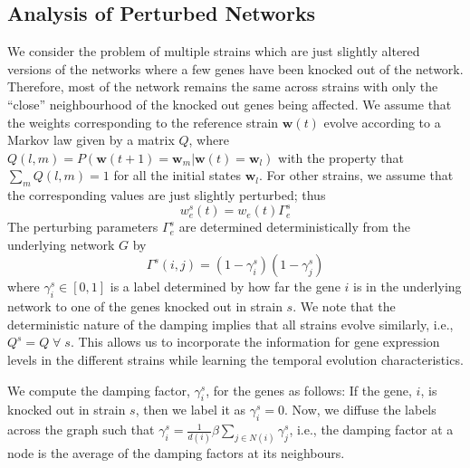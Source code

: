 \documentclass{bioinfo}
\begin{document}
\begin{methods}
\subsection{Analysis of Perturbed Networks}
\label{sec:strain-damping-model} 
We consider the problem of multiple strains which are just slightly
altered versions of the networks where a few genes have been knocked out of the
network. Therefore, most of the network remains the same across
strains with only the ``close'' neighbourhood of the knocked out genes
being affected. %
We assume that the weights corresponding to the reference strain
$\mathbf{w}(t)$ evolve according to a Markov law given by a matrix $Q$,
where $Q(l, m) = P(\mathbf{w}(t+1) = \mathbf{w}_{m} | {\mathbf w}(t)
= \mathbf{w}_{l})$ with the property that $\sum_{m} Q(l, m) = 1$ for
all the initial states $\mathbf{w}_{l}$. For other strains, we assume
that the corresponding values are just slightly perturbed; thus
\begin{equation}
  \label{eq:damping}
 w^s_e(t) = w_e(t) \Gamma^s_e
\end{equation}
The perturbing parameters $\Gamma^s_e$ are determined
deterministically from the underlying network $G$ by
\begin{equation}
  \label{eq:edge-damping}
\Gamma^s(i,j) = (1 - \gamma^s_i)(1 - \gamma^s_j)  
\end{equation}
where $\gamma^s_i \in [0,1]$ is a label determined by how far the gene
$i$ is in the underlying network to one of the genes knocked out in
strain $s$. We note that the deterministic nature of the damping
implies that all strains evolve similarly, i.e., $Q^{s} = Q\;
\forall \; s$. This allows us to incorporate the information for gene
expression levels in the different strains while learning the temporal
evolution characteristics. 

We compute the damping factor, $\gamma^s_i$, for the genes
as follows: If the gene, $i$, is knocked out in strain $s$, then we
label it as $\gamma^s_i=0$. Now, we diffuse the labels across the
graph  such that $\gamma^{s}_i = \frac{1}{d(i)} \beta
\sum_{j\in N(i)} \gamma_j^s$, i.e., the damping factor at a node is
the average of the damping factors at its neighbours.    


\end{methods}
\end{document}
